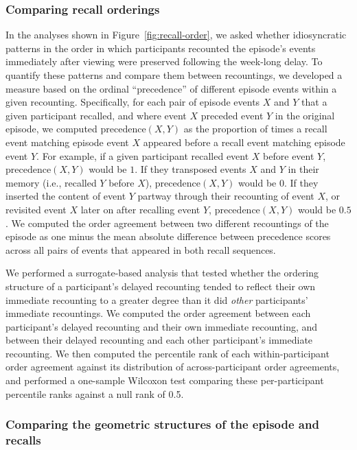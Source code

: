 \documentclass[10pt]{article}
\begin{document}
\subsubsection*{Comparing recall orderings}\label{subsec:precedence}

In the analyses shown in Figure~\ref{fig:recall-order}, we asked whether idiosyncratic patterns in the order in which participants recounted the episode's events immediately after viewing were preserved following the week-long delay.
To quantify these patterns and compare them between recountings, we developed a measure based on the ordinal ``precedence'' of different episode events within a given recounting.
Specifically, for each pair of episode events $X$ and $Y$ that a given participant recalled, and where event $X$ preceded event $Y$ in the original episode, we computed $\mathrm{precedence}(X, Y)$ as the proportion of times a recall event matching episode event $X$ appeared before a recall event matching episode event $Y$.
For example, if a given participant recalled event $X$ before event $Y$, $\mathrm{precedence}(X, Y)$ would be $1$. If they transposed events $X$ and $Y$ in their memory (i.e., recalled $Y$ before $X$), $\mathrm{precedence}(X, Y)$ would be $0$. If they inserted the content of event $Y$ partway through their recounting of event $X$, or revisited event $X$ later on after recalling event $Y$, $\mathrm{precedence}(X, Y)$ would be $0.5$.
We computed the order agreement between two different recountings of the episode as one minus the mean absolute difference between precedence scores across all pairs of events that appeared in both recall sequences. 

We performed a surrogate-based analysis that tested whether the ordering structure of a participant's delayed recounting tended to reflect their own immediate recounting to a greater degree than it did \textit{other} participants' immediate recountings.
We computed the order agreement between each participant's delayed recounting and their own immediate recounting, and between their delayed recounting and each other participant's immediate recounting.
We then computed the percentile rank of each within-participant order agreement against its distribution of across-participant order agreements, and performed a one-sample Wilcoxon test comparing these per-participant percentile ranks against a null rank of 0.5.


\subsubsection*{Comparing the geometric structures of the episode and recalls}\label{subsec:dtw}
\end{document}
